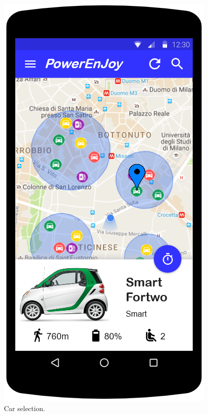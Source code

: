 \begin{figure}
	\centering
	\includegraphics[width=\textwidth,height=\dimexpr\textheight-4\baselineskip-\abovecaptionskip-\belowcaptionskip\relax,keepaspectratio]{overall_description/mockup/car_selection.png}
	\caption{Car selection.}
	\label{fig:mockup_car_selection}
\end{figure}

